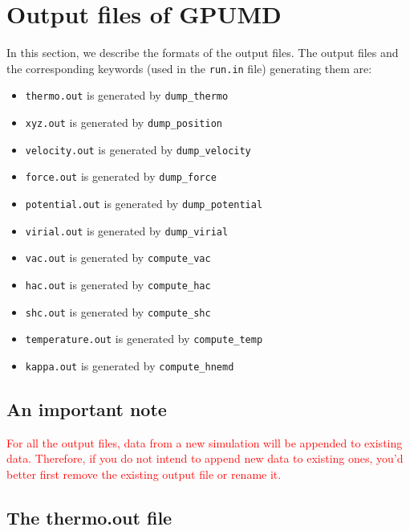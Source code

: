 \documentclass[12pt,a4paper]{report}
\begin{document}
\section{Output files of GPUMD}

In this section, we describe the formats of the output files. The output files and the corresponding keywords (used in the \verb"run.in" file) generating them are:
\begin{itemize}
\item \verb"thermo.out" is generated by \verb"dump_thermo"
\item \verb"xyz.out" is generated by \verb"dump_position"
\item \verb"velocity.out" is generated by \verb"dump_velocity"
\item \verb"force.out" is generated by \verb"dump_force"
\item \verb"potential.out" is generated by \verb"dump_potential"
\item \verb"virial.out" is generated by \verb"dump_virial"
\item \verb"vac.out" is generated by \verb"compute_vac"
\item \verb"hac.out" is generated by \verb"compute_hac"
\item \verb"shc.out" is generated by \verb"compute_shc"
\item \verb"temperature.out" is generated by \verb"compute_temp"
\item \verb"kappa.out" is generated by \verb"compute_hnemd"
\end{itemize}


\subsection{An important note}

\textcolor{red}{For all the output files, data from a new simulation will be appended to existing data. Therefore, if you do not intend to append new data to existing ones, you'd better first remove the existing output file or rename it.}

\subsection{The thermo.out file}
\end{document}
